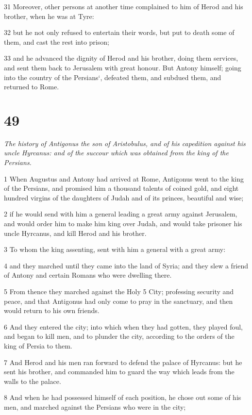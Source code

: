 31 Moreover, other persons at another time complained to him of Herod and his brother, when he was at Tyre: 

32 but he not only refused to entertain their words, but put to death some of them, and cast the rest into prison; 

33 and he advanced the dignity of Herod and his brother, doing them services, and sent them back to Jerusalem with great honour. But Antony himself; going into the country of the Persians‘, defeated them, and subdued them, and returned to Rome. 

\chapter{49}

\par \textit{The history of Antigonus the son of Aristobulus, and of his capedition against his uncle Hyrcanus: and of the succour which was obtained from the king of the Persians.}

1 When Augustus and Antony had arrived at Rome, Antigonus went to the king of the Persians, and promised him a thousand talents of coined gold, and eight hundred virgins of the daughters of Judah and of its princes, beautiful and wise; 

2 if he would send with him a general leading a great army against Jerusalem, and would order him to make him king over Judah, and would take prisoner his uncle Hyrcanus, and kill Herod and his brother. 

3 To whom the king assenting, sent with him a general with a great army: 

4 and they marched until they came into the land of Syria; and they slew a friend of Antony and certain Romans who were dwelling there. 

5 From thence they marched against the Holy 5 City; professing security and peace, and that Antigonus had only come to pray in the sanctuary, and then would return to his own friends. 

6 And they entered the city; into which when they had gotten, they played foul, and began to kill men, and to plunder the city, according to the orders of the king of Persia to them. 

7 And Herod and his men ran forward to defend the palace of Hyrcanus: but he sent his brother, and commanded him to guard the way which leads from the walls to the palace. 

8 And when he had possessed himself of each position, he chose out some of his men, and marched against the Persians who were in the city; 

